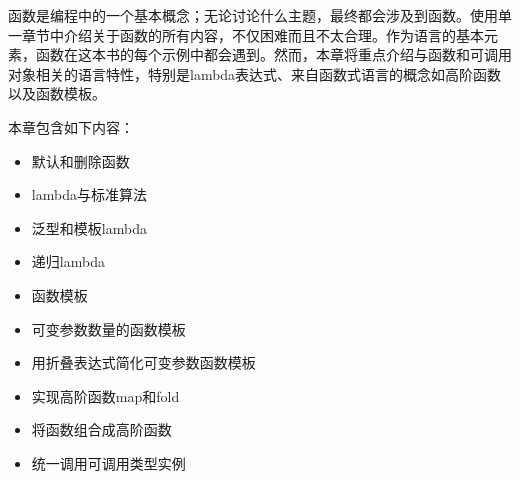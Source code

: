 函数是编程中的一个基本概念；无论讨论什么主题，最终都会涉及到函数。使用单一章节中介绍关于函数的所有内容，不仅困难而且不太合理。作为语言的基本元素，函数在这本书的每个示例中都会遇到。然而，本章将重点介绍与函数和可调用对象相关的语言特性，特别是lambda表达式、来自函数式语言的概念如高阶函数以及函数模板。

本章包含如下内容：

\begin{itemize}
\item
默认和删除函数

\item
lambda与标准算法

\item
泛型和模板lambda

\item
递归lambda

\item
函数模板

\item
可变参数数量的函数模板

\item
用折叠表达式简化可变参数函数模板

\item
实现高阶函数map和fold

\item
将函数组合成高阶函数

\item
统一调用可调用类型实例
\end{itemize}
